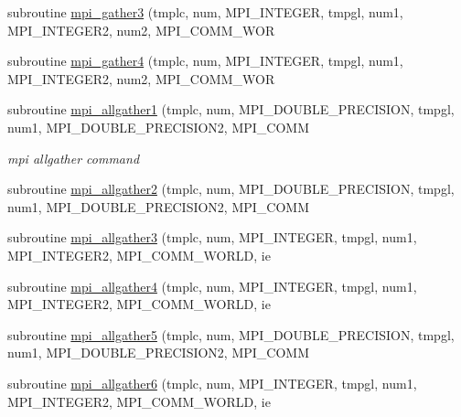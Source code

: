 \begin{DoxyCompactItemize}
\item 
subroutine \mbox{\hyperlink{namespacempistub_a4a5262ac6eca022843c0cd39b508e35f}{mpi\+\_\+gather3}} (tmplc, num, M\+P\+I\+\_\+\+I\+N\+T\+E\+G\+ER, tmpgl, num1, M\+P\+I\+\_\+\+I\+N\+T\+E\+G\+E\+R2, num2, M\+P\+I\+\_\+\+C\+O\+M\+M\+\_\+\+W\+OR
\item 
subroutine \mbox{\hyperlink{namespacempistub_a6c7b2f5337f97885b72a76ec35729075}{mpi\+\_\+gather4}} (tmplc, num, M\+P\+I\+\_\+\+I\+N\+T\+E\+G\+ER, tmpgl, num1, M\+P\+I\+\_\+\+I\+N\+T\+E\+G\+E\+R2, num2, M\+P\+I\+\_\+\+C\+O\+M\+M\+\_\+\+W\+OR
\item 
subroutine \mbox{\hyperlink{namespacempistub_a61c97c834a766b0372d758a4158ae7da}{mpi\+\_\+allgather1}} (tmplc, num, M\+P\+I\+\_\+\+D\+O\+U\+B\+L\+E\+\_\+\+P\+R\+E\+C\+I\+S\+I\+ON, tmpgl, num1, M\+P\+I\+\_\+\+D\+O\+U\+B\+L\+E\+\_\+\+P\+R\+E\+C\+I\+S\+I\+O\+N2, M\+P\+I\+\_\+\+C\+O\+MM
\begin{DoxyCompactList}\small\item\em mpi allgather command \end{DoxyCompactList}\item 
subroutine \mbox{\hyperlink{namespacempistub_a4af9ae68605228fa295ff15192cad31c}{mpi\+\_\+allgather2}} (tmplc, num, M\+P\+I\+\_\+\+D\+O\+U\+B\+L\+E\+\_\+\+P\+R\+E\+C\+I\+S\+I\+ON, tmpgl, num1, M\+P\+I\+\_\+\+D\+O\+U\+B\+L\+E\+\_\+\+P\+R\+E\+C\+I\+S\+I\+O\+N2, M\+P\+I\+\_\+\+C\+O\+MM
\item 
subroutine \mbox{\hyperlink{namespacempistub_a60f773685d2ab6f25d3d674acd53d941}{mpi\+\_\+allgather3}} (tmplc, num, M\+P\+I\+\_\+\+I\+N\+T\+E\+G\+ER, tmpgl, num1, M\+P\+I\+\_\+\+I\+N\+T\+E\+G\+E\+R2, M\+P\+I\+\_\+\+C\+O\+M\+M\+\_\+\+W\+O\+R\+LD, ie
\item 
subroutine \mbox{\hyperlink{namespacempistub_a2b8f9c4bef9676116ba1eeb6b4e72af5}{mpi\+\_\+allgather4}} (tmplc, num, M\+P\+I\+\_\+\+I\+N\+T\+E\+G\+ER, tmpgl, num1, M\+P\+I\+\_\+\+I\+N\+T\+E\+G\+E\+R2, M\+P\+I\+\_\+\+C\+O\+M\+M\+\_\+\+W\+O\+R\+LD, ie
\item 
subroutine \mbox{\hyperlink{namespacempistub_afa6d7737a2157021051c7c4e7c159079}{mpi\+\_\+allgather5}} (tmplc, num, M\+P\+I\+\_\+\+D\+O\+U\+B\+L\+E\+\_\+\+P\+R\+E\+C\+I\+S\+I\+ON, tmpgl, num1, M\+P\+I\+\_\+\+D\+O\+U\+B\+L\+E\+\_\+\+P\+R\+E\+C\+I\+S\+I\+O\+N2, M\+P\+I\+\_\+\+C\+O\+MM
\item 
subroutine \mbox{\hyperlink{namespacempistub_ace33f6f5c0cff4120ef8d624a20adf59}{mpi\+\_\+allgather6}} (tmplc, num, M\+P\+I\+\_\+\+I\+N\+T\+E\+G\+ER, tmpgl, num1, M\+P\+I\+\_\+\+I\+N\+T\+E\+G\+E\+R2, M\+P\+I\+\_\+\+C\+O\+M\+M\+\_\+\+W\+O\+R\+LD, ie

\end{DoxyCompactItemize}
